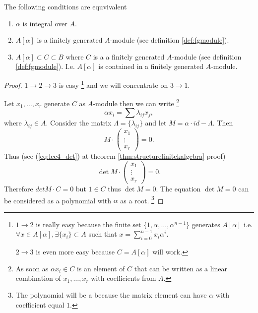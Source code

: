 \begin{lemma}
  The following conditions are equvivalent
  \begin{enumerate}
  \item $\alpha$ is integral over $A$.
  \item $A\left[\alpha\right]$ is a finitely generated $A$-module
    (see definition \ref{def:fgmodule}).
  \item $A\left[\alpha\right] \subset C \subset B$ where $C$ is a a
    finitely generated 
    $A$-module (see definition \ref{def:fgmodule}). I.e.
    $A\left[\alpha\right]$ is contained in a finitely generated $A$-module.
  \end{enumerate}
  \label{lem:lec9_1}
  \begin{proof}
    $1 \to 2 \to 3$ is easy
    \footnote{
      $1 \to 2$ is really easy because the finite set $\{1,\alpha,
      \dots, \alpha^{n-1}\}$ generates
      $A\left[\alpha\right]$ i.e.
      $\forall x \in A\left[\alpha\right], \exists \{x_i\}
      \subset A$ such that $x = \sum_{i=0}^{n-1} x_i \alpha^{i}$.

      $2 \to 3$ is even more easy because $C=A\left[\alpha\right]$ will work.
    } and we will concentrate on $3 \to 1$.

    Let $x_1, \dots, x_r$ generate $C$ as $A$-module then we can write
    \footnote{
      As soon as $\alpha x_i \in C$ is an element of $C$ that can be written
      as a linear combination of
      $x_1, \dots, x_r$ with coefficients from $A$.
    }
    \[
    \alpha x_i = \sum \lambda_{ij}x_j,
    \]
    where $\lambda_{ij} \in A$. Consider the matrix
    $\Lambda = \{\lambda_{ij}\}$ and let $M = \alpha \cdot id -
    \Lambda$. Then
    \[
    M \cdot
    \begin{pmatrix}
      x_1 \\ \vdots \\ x_r
    \end{pmatrix} = 0.
    \]
    Thus (see (\ref{eq:lec4_det}) at theorem
    \ref{thm:structurefinitekalgebra} proof)
    \[
    \det M \cdot
    \begin{pmatrix}
      x_1 \\ \vdots \\ x_r
    \end{pmatrix} = 0.
    \]
    Therefore $det M \cdot C = 0$ but $1 \in C$ thus $\det M = 0$.
    The equation $\det M = 0$ can be considered as a polynomial with
    $\alpha$ as a root.
    \footnote{
      The polynomial will be a  because
      the matrix element can have $\alpha$ with coefficient equal $1$.
    }
  \end{proof}
\end{lemma}


